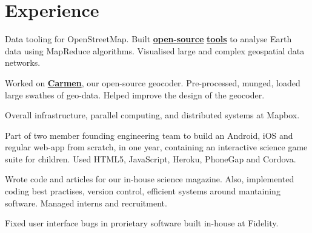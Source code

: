 \documentclass[]{deedy-resume-openfont}
\begin{document}
\begin{minipage}[t]{0.66\textwidth} 


\section{Experience}

\vspace{\topsep} %
\begin{tightemize}
\item Data tooling for OpenStreetMap. Built \textbf{\href{https://github.com/mapbox/osm-tag-stats/issues}{open-source}} \textbf{\href{https://github.com/mapbox/osm-edit-report-deprecated/graphs/contributors}{tools}} to analyse Earth data using MapReduce algorithms. Visualised large and complex geospatial data networks.
\item Worked on \textbf{\href{https://github.com/mapbox/carmen/}{Carmen}}, our open-source geocoder. Pre-processed, munged, loaded large swathes of geo-data. Helped improve the design of the geocoder.
\item Overall infrastructure, parallel computing, and distributed systems at Mapbox.
\end{tightemize}
\sectionsep

\begin{tightemize}
\item Part of two member founding engineering team to build an Android, iOS and regular web-app from scratch, in one year, containing an interactive science game suite for children. Used HTML5, JavaScript, Heroku, PhoneGap and Cordova.
\item Wrote code and articles for our in-house science magazine. Also, implemented coding best practises, version control, efficient systems around mantaining software. Managed interns and recruitment.
\end{tightemize}
\sectionsep

\begin{tightemize}
\item Fixed user interface bugs in prorietary software built in-house at Fidelity.
\end{tightemize}
\sectionsep


\end{minipage}
\end{document}
